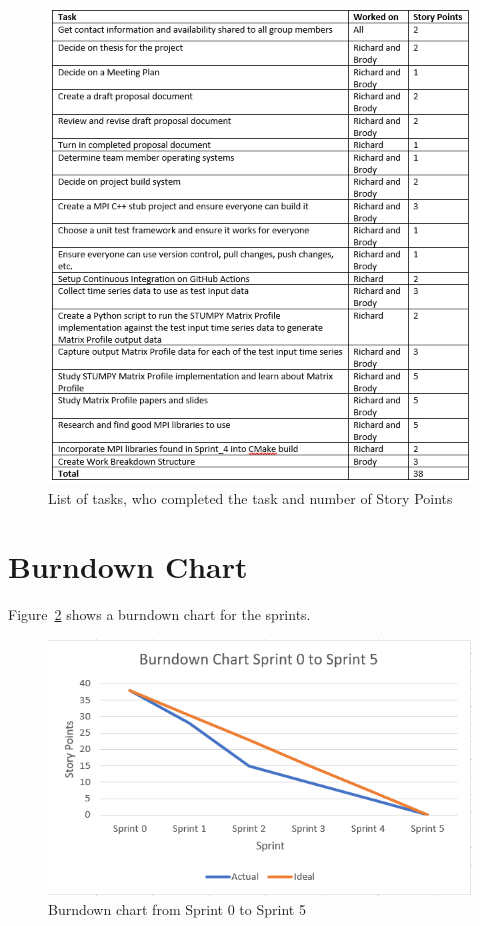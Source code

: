 \documentclass[conference]{IEEEtran}
\begin{document}
\begin{figure}
\begin{center}
\includegraphics[scale=1.05]{tasks.png}
\caption{List of tasks, who completed the task and number of Story Points}
\label{fig:SprintTasks}
\end{center}
\end{figure}


\section{Burndown Chart}

Figure~\ref{fig:BurndownChart} shows a burndown chart for the sprints.

\begin{figure}
\begin{center}
\includegraphics[scale=1.05]{Burndown.png}
\caption{Burndown chart from Sprint 0 to Sprint 5}
\label{fig:BurndownChart}
\end{center}
\end{figure}
\end{document}
